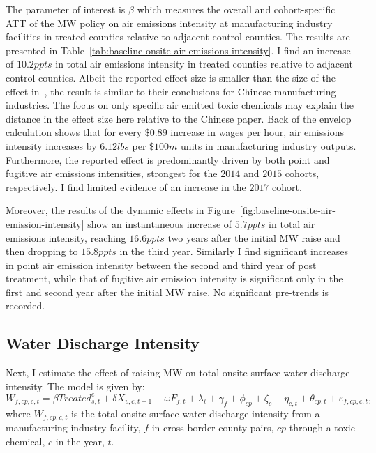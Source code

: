 \documentclass{C:/Users/david/OneDrive/Documents/ULMS/PhD/Thesis/chapter3/src/climate_change/latex/Economic_Journal/OUP-EJ}
\begin{document}
    The parameter of interest is $\beta$ which measures the overall and cohort-specific ATT of the MW policy on air emissions intensity at manufacturing industry facilities in treated counties relative to adjacent control counties. The results are presented in Table~\ref{tab:baseline-onsite-air-emissions-intensity}. I find an increase of $10.2ppts$ in total air emissions intensity in treated counties relative to adjacent control counties. Albeit the reported effect size is smaller than the size of the effect in~\citet{zhang2023unintended}, the result is similar to their conclusions for Chinese manufacturing industries. The focus on only specific air emitted toxic chemicals may explain the distance in the effect size here relative to the Chinese paper. Back of the envelop calculation shows that for every $\$0.89$ increase in wages per hour, air emissions intensity increases by $6.12lbs$ per $\$100m$ units in manufacturing industry outputs. Furthermore, the reported effect is predominantly driven by both point and fugitive air emissions intensities, strongest for the $2014$ and $2015$ cohorts, respectively. I find limited evidence of an increase in the $2017$ cohort.

    Moreover, the results of the dynamic effects in Figure~\ref{fig:baseline-onsite-air-emission-intensity} show an instantaneous increase of $5.7ppts$ in total air emissions intensity, reaching $16.6ppts$ two years after the initial MW raise and then dropping to $15.8ppts$ in the third year. Similarly I find significant increases in point air emission intensity between the second and third year of post treatment, while that of fugitive air emission intensity is significant only in the first and second year after the initial MW raise. No significant pre-trends is recorded.
    

    \subsection{Water Discharge Intensity}\label{subsec:water-discharge-intensity}
    Next, I estimate the effect of raising MW on total onsite surface water discharge intensity. The model is given by:
    \begin{equation}
        W_{f,cp,c,t} = \beta Treated_{s,t}^e + \delta X_{v,c,t-1} + \omega F_{f,t} + \lambda_{t} + \gamma_{f} + \phi_{cp} + \zeta_{c} + \eta_{c,t} + \theta_{cp,t} + \varepsilon_{f,cp,c,t},\label{eq:baseline-onsite-water-discharge-intensity}
    \end{equation}
    where $W_{f,cp,c,t}$ is the total onsite surface water discharge intensity from a manufacturing industry facility, $f$ in cross-border county pairs, $cp$ through a toxic chemical, $c$ in the year, $t$.
\end{document}
